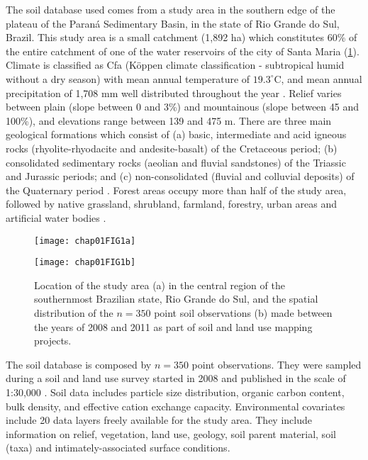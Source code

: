 The soil database used comes from a study area in the southern edge of the 
plateau of the Paraná Sedimentary Basin, in the state of Rio Grande do Sul, 
Brazil. This study area is a small catchment (1,892 ha) which constitutes 60\% 
of the entire catchment of one of the water reservoirs of the city of Santa 
Maria (\ref{fig:location-intro}). Climate is classified as Cfa (Köppen climate 
classification - subtropical humid without a dry season) with mean annual 
temperature of $19.3^{\circ}$C, and mean annual precipitation of 1,708 mm well 
distributed throughout the year \cite{Maluf2000}. Relief varies between plain 
(slope between 0 and 3\%) and mountainous (slope between 45 and 100\%), and 
elevations range between 139 and 475 m. There are three main geological 
formations which consist of (a) basic, intermediate and acid igneous rocks 
(rhyolite-rhyodacite and andesite-basalt) of the Cretaceous period; (b) 
consolidated sedimentary rocks (aeolian and fluvial sandstones) of the Triassic
and Jurassic periods; and (c) non-consolidated (fluvial and colluvial deposits)
of the Quaternary period \cite{GasparettoEtAl1988, MacielFilho1990, Sartori2009}.
Forest areas occupy more than half of the study area, followed by native 
grassland, shrubland, farmland, forestry, urban areas and artificial water 
bodies \cite{SamuelRosaEtAl2011a}.

\begin{figure}[!ht]
    \centering
    \begin{minipage}[b]{95mm}
      \subcaption{}
      \label{fig:brazil}
      \centering
      \texttt{[image: chap01FIG1a]}
    \end{minipage}
    \begin{minipage}[b]{95mm}
      \subcaption{}
      \label{fig:points}
      \centering
      \texttt{[image: chap01FIG1b]}
    \end{minipage}
  \caption{Location of the study area (a) in the central region of the 
  southernmost Brazilian state, Rio Grande do Sul, and the spatial distribution 
  of the $n=350$ point soil observations (b) made between the years of 2008 and
  2011 as part of soil and land use mapping projects.}
  \label{fig:location-intro}
\end{figure}

The soil database is composed by $n=350$ point observations. They were sampled 
during a soil and land use survey started in 2008 and published in the scale of
1:30,000 \cite{SamuelRosaEtAl2011a, MiguelEtAl2012}. Soil data includes 
particle size distribution, organic carbon content, bulk density, and effective 
cation exchange capacity. Environmental covariates include 20 data layers freely
available for the study area. They include information on relief, vegetation, 
land use, geology, soil parent material, soil (taxa) and intimately-associated 
surface conditions.

